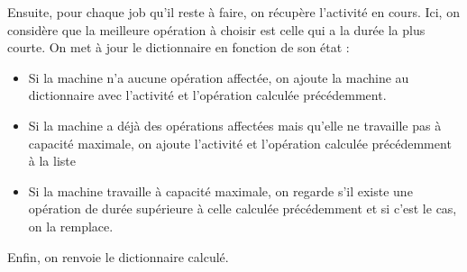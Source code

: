 Ensuite, pour chaque job qu'il reste à faire, on récupère l'activité en cours. Ici, on considère que la meilleure opération à choisir est celle qui a la durée la plus courte. On met à jour le dictionnaire en fonction de son état :
\begin{itemize}
    \item Si la machine n'a aucune opération affectée, on ajoute la machine au dictionnaire avec l'activité et l'opération calculée précédemment.
    \item Si la machine a déjà des opérations affectées mais qu'elle ne travaille pas à capacité maximale, on ajoute l'activité et l'opération calculée précédemment à la liste
    \item Si la machine travaille à capacité maximale, on regarde s'il existe une opération de durée supérieure à celle calculée précédemment et si c'est le cas, on la remplace.
\end{itemize}



Enfin, on renvoie le dictionnaire calculé.
